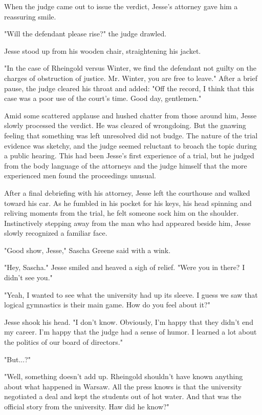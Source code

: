When the judge came out to issue the verdict, Jesse's attorney gave him a reassuring smile.

"Will the defendant please rise?" the judge drawled.

Jesse stood up from his wooden chair, straightening his jacket.

"In the case of Rheingold versus Winter, we find the defendant not guilty on the charges of obstruction of justice.  Mr. Winter, you are free to leave."  After a brief pause, the judge cleared his throat and added: "Off the record, I think that this case was a poor use of the court's time.  Good day, gentlemen."

Amid some scattered applause and hushed chatter from those around him, Jesse slowly processed the verdict.  He was cleared of wrongdoing.  But the gnawing feeling that something was left unresolved did not budge.  The nature of the trial evidence was sketchy, and the judge seemed reluctant to broach the topic during a public hearing.  This had been Jesse's first experience of a trial, but he judged from the body language of the attorneys and the judge himself that the more experienced men found the proceedings unusual.

After a final debriefing with his attorney, Jesse left the courthouse and walked toward his car.  As he fumbled in his pocket for his keys, his head spinning and reliving moments from the trial, he felt someone sock him on the shoulder.  Instinctively stepping away from the man who had appeared beside him, Jesse slowly recognized a familiar face.

"Good show, Jesse," Sascha Greene said with a wink.

"Hey, Sascha."  Jesse smiled and heaved a sigh of relief.  "Were you in there?  I didn't see you."

"Yeah, I wanted to see what the university had up its sleeve.  I guess we saw that logical gymnastics is their main game.  How do you feel about it?"

Jesse shook his head.  "I don't know.  Obviously, I'm happy that they didn't end my career.  I'm happy that the judge had a sense of humor.  I learned a lot about the politics of our board of directors."

"But...?"

"Well, something doesn't add up.  Rheingold shouldn't have known anything about what happened in Warsaw.  All the press knows is that the university negotiated a deal and kept the students out of hot water.  And that was the official story from the university.  Haw did he know?"

